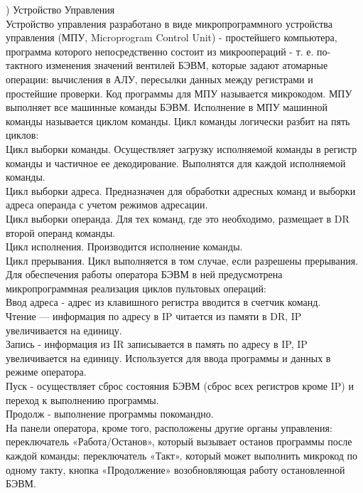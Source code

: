 ) Устройство Управления \\
Устройство управления разработано в виде микропрограммного устройства управления (МПУ, Microprogram Control Unit) - простейшего компьютера, программа которого непосредственно состоит из микроопераций - т. е. по-тактного изменения значений вентилей БЭВМ, которые задают атомарные операции: вычисления в АЛУ, пересылки данных между регистрами и простейшие проверки. Код программы для МПУ называется микрокодом.
МПУ выполняет все машинные команды БЭВМ. Исполнение в МПУ машинной команды называется циклом команды. Цикл команды логически разбит на пять циклов: \\
Цикл выборки команды. Осуществляет загрузку исполняемой команды в регистр команды и частичное ее декодирование. Выполнятся для каждой исполняемой команды. \\
Цикл выборки адреса. Предназначен для обработки адресных команд и выборки адреса операнда с учетом режимов адресации. \\
Цикл выборки операнда. Для тех команд, где это необходимо, размещает в DR второй операнд команды. \\
Цикл исполнения. Производится исполнение команды. \\
Цикл прерывания. Цикл выполняется в том случае, если разрешены прерывания. \\
Для обеспечения работы оператора БЭВМ в ней предусмотрена микропрограммная реализация циклов пультовых операций: \\
Ввод адреса - адрес из клавишного регистра вводится в счетчик команд. \\
Чтение — информация по адресу в IP читается из памяти в DR, IP увеличивается на единицу. \\
Запись -  информация из IR записывается в память по адресу в IP, IP увеличивается на единицу. Используется для ввода программы и данных в режиме оператора. \\
Пуск - осуществляет сброс состояния БЭВМ (сброс всех регистров кроме IP) и переход к выполнению программы. \\
Продолж - выполнение программы покомандно. \\
На панели оператора, кроме того, расположены другие органы управления: переключатель «Работа/Останов», который вызывает останов программы после каждой команды; переключатель «Такт», который может выполнить микрокод по одному такту, кнопка «Продолжение» возобновляющая работу остановленной БЭВМ. \\

